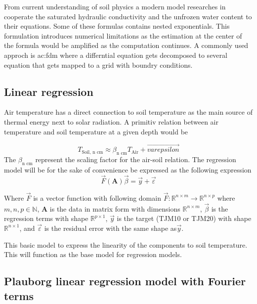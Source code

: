 From current understanding of soil physics a modern model researches in cooperate the saturated hydraulic conductivity and the unfrozen water content to their equations\cite{stuurop_influence_2022}. Some of these formulas contains nested exponentials\cite{stuurop_influence_2022}. This formulation introduces numerical limitations as the estimation at the center of the formula would be amplified as the computation continues. A commonly used approch is \acrfull{ac:fdm} where a differntial equation gets decomposed to several equation that gets mapped to a grid with boundry conditions\cite{singh_numerical_2017,rankinen_simple_2004,cleall_analytical_2015}. 


\subsection{Linear regression}\label{sec:theory:linreg}

Air temperature has a direct connection to soil temperature as the main source of thermal energy next to solar radiation. A primitiv relation between air temperature and soil temperature at a given depth would be

\begin{equation}
	T_{\text{Soil, n cm}} \approx \beta_{\text{n cm}} T_{\text{Air}} + \vec{varepsilon}
\end{equation}
The $\beta_{\text{n cm}}$ represent the scaling factor for the air-soil relation. The regression model will be for the sake of convenience be expressed as the following expression
\begin{equation}
	\vec{F}(\mathbf{A})\vec{\beta}=\vec{y}+\vec{\varepsilon}
\end{equation}

Where $\vec{F}$ is a vector function with following domain $\vec{F}:\mathbb{R}^{n\times m}\to \mathbb{R}^{n\times p}$ where $m,n,p\in \mathbb{N}$, $\mathbf{A}$ is the data in matrix form with dimensions $\mathbb{R}^{n\times m}$, $\vec{\beta}$ is the regression terms with shape $\mathbb{R}^{p\times 1}$, $\vec{y}$ is the target (TJM10 or TJM20) with shape $\mathbb{R}^{n\times 1}$, and $\vec{\varepsilon}$ is the residual error with the same shape as$\vec{y}$.

This basic model to express the linearity of the components to soil temperature. This will function as the base model for regression models. 

\subsection[Plauborg Regression]{Plauborg linear regression model with Fourier terms}\label{sec:theory:pluborg}

